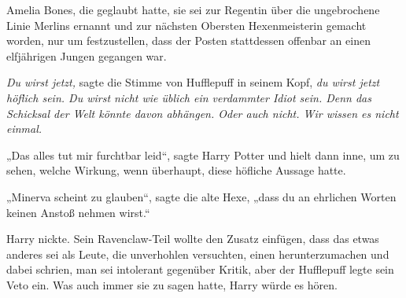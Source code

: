 Amelia Bones, die geglaubt hatte, sie sei zur Regentin über die ungebrochene Linie Merlins ernannt und zur nächsten Obersten Hexenmeisterin gemacht worden, nur um festzustellen, dass der Posten stattdessen offenbar an einen elfjährigen Jungen gegangen war.

\emph{Du wirst jetzt,} sagte die Stimme von Hufflepuff in seinem Kopf, \emph{du wirst jetzt höflich sein. Du wirst nicht wie üblich ein verdammter Idiot sein. Denn das Schicksal der Welt könnte davon abhängen. Oder auch nicht. Wir wissen es nicht einmal.}

„Das alles tut mir furchtbar leid“, sagte Harry Potter und hielt dann inne, um zu sehen, welche Wirkung, wenn überhaupt, diese höfliche Aussage hatte.

„Minerva scheint zu glauben“, sagte die alte Hexe, „dass du an ehrlichen Worten keinen Anstoß nehmen wirst.“

Harry nickte.
Sein Ravenclaw-Teil wollte den Zusatz einfügen, dass das etwas anderes sei als Leute, die unverhohlen versuchten, einen herunterzumachen und dabei schrien, man sei intolerant gegenüber Kritik, aber der Hufflepuff legte sein Veto ein. Was auch immer sie zu sagen hatte, Harry würde es hören.

